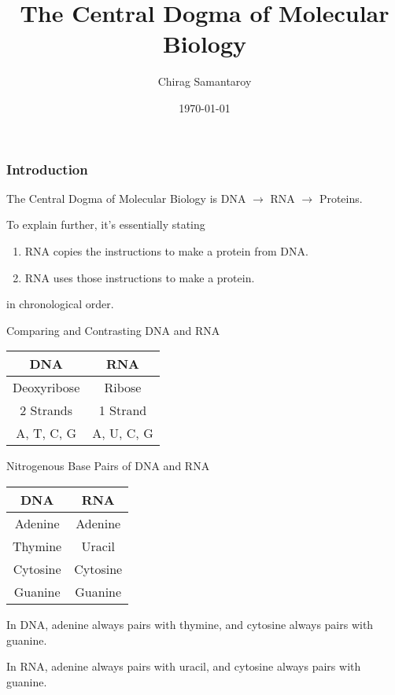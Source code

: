 \documentclass{beamer}
\title{The Central Dogma of Molecular Biology}
\author{Chirag Samantaroy}
\date{\today}
\begin{document}
\maketitle

\begin{frame}
\frametitle{Introduction}
The Central Dogma of Molecular Biology is DNA $\rightarrow$ RNA $\rightarrow$ Proteins.

\bigskip \noindent To explain further, it's essentially stating
\begin{enumerate}
    \item RNA copies the instructions to make a protein from DNA.
    \item RNA uses those instructions to make a protein.
\end{enumerate}
in chronological order.
\end{frame}

\begin{frame}{Comparing and Contrasting DNA and RNA}
\begin{center}
\begin{tabular}{ c|c }
DNA & RNA\\ \hline
Deoxyribose & Ribose \\ \hline
2 Strands & 1 Strand \\ \hline
A, T, C, G & A, U, C, G
\end{tabular}
\end{center}
\end{frame}

\begin{frame}{Nitrogenous Base Pairs of DNA and RNA}
\begin{center}
\begin{tabular}{ c|c }
DNA & RNA \\ \hline
Adenine & Adenine \\ \hline
Thymine & Uracil \\ \hline
Cytosine & Cytosine \\ \hline
Guanine & Guanine
\end{tabular}  
\end{center}
In DNA, adenine always pairs with thymine, and cytosine always pairs with guanine.

\bigskip In RNA, adenine always pairs with uracil, and cytosine always pairs with guanine.

\end{frame}
\end{document}
